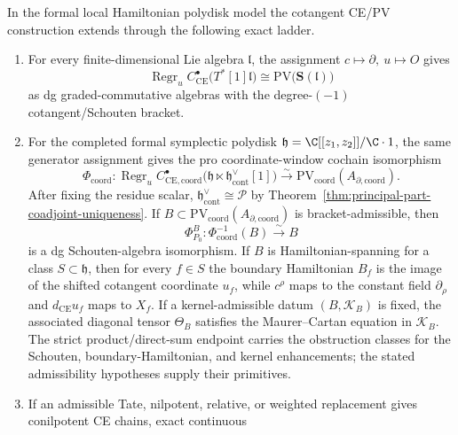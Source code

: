 \documentclass[11pt]{memoir}
\begin{document}
\begin{thm}
  \label{thm:universal-ce-pv-koszul-criterion}
  In the formal local Hamiltonian polydisk model the cotangent CE/PV
  construction extends through the following exact ladder.
  \begin{enumerate}
    \item For every finite-dimensional Lie algebra \(\mathfrak l\), the
      assignment \(c\mapsto\partial,\ u\mapsto O\) gives
      \[
        \operatorname{Regr}_u
        C^\bullet_{\mathrm{CE}}\bigl(T^*[1]\mathfrak l\bigr)
        \cong
        \mathrm{PV}\bigl(\mathbf S(\mathfrak l)\bigr)
      \]
	      as dg graded-commutative algebras with the degree-\((-1)\)
	      cotangent/Schouten bracket.
    \item For the completed formal symplectic polydisk
      \(\mathfrak h=\C[[z_1,z_2]]/\C\cdot1\), the same generator
			      assignment gives the pro coordinate-window cochain
		      isomorphism
      \[
		        \Phi_{\mathrm{coord}}\colon
        \operatorname{Regr}_u
        C^\bullet_{\mathrm{CE},\mathrm{coord}}
        \bigl(\mathfrak h\ltimes
          \mathfrak h^\vee_{\mathrm{cont}}[1]\bigr)
        \xrightarrow{\sim}
		        \mathrm{PV}_{\mathrm{coord}}(A_{\partial,\mathrm{coord}}).
		      \]
      After fixing the residue scalar,
      \(\mathfrak h^\vee_{\mathrm{cont}}\cong\mathcal P\) by
      Theorem~\ref{thm:principal-part-coadjoint-uniqueness}.  If
      \(B\subset\mathrm{PV}_{\mathrm{coord}}(A_{\partial,\mathrm{coord}})\)
      is bracket-admissible, then
      \[
        \Phi^B_{P_0}\colon\Phi_{\mathrm{coord}}^{-1}(B)
        \xrightarrow{\sim}B
      \]
      is a dg Schouten-algebra isomorphism.  If \(B\) is Hamiltonian-spanning for a
      class \(S\subset\mathfrak h\), then for every \(f\in S\) the
      boundary Hamiltonian \(B_f\) is the image of the shifted cotangent
      coordinate \(u_f\), while \(c^\rho\) maps to the constant field
      \(\partial_\rho\) and \(d_{\mathrm{CE}}u_f\) maps to \(X_f\).  If a kernel-admissible datum
      \((B,\mathcal K_B)\) is fixed, the associated diagonal tensor
      \(\Theta_B\) satisfies the Maurer--Cartan equation in
      \(\mathcal K_B\).  The strict product/direct-sum endpoint carries
      the obstruction classes for the Schouten, boundary-Hamiltonian,
      and kernel enhancements; the stated admissibility hypotheses
      supply their primitives.
	    \item If an admissible Tate, nilpotent, relative, or weighted
	      replacement gives conilpotent CE chains, exact continuous

\end{enumerate}
\end{thm}
\end{document}

